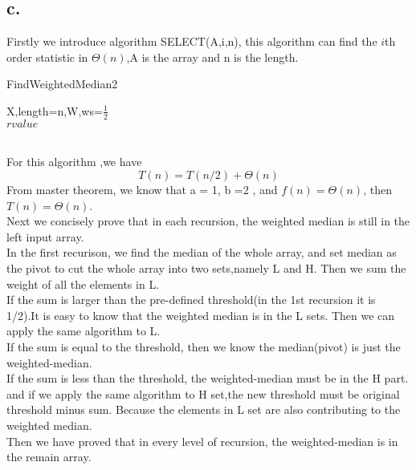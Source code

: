 \documentclass[oneside]{homework} %
\begin{document}
\subsection* {c.}
Firstly we introduce algorithm SELECT(A,i,n), this algorithm can find the $i$th order statistic in $\Theta(n)$,A is the array and n is the length.
  \begin{algorithm}[h]
  \caption{FindWeightedMedian2}
  \label{algo:weightmedian2}
  \begin{algorithmic}[1]
	\REQUIRE X,length=n,W,ws=$\frac{1}{2}$
	\ENSURE ~ ~\\ 
	\ENDIF
	\ELSE
	\ENDIF
	\LASTCON $rvalue$	
  \end{algorithmic}
  \end{algorithm}
\\ For this algorithm ,we have
\begin{equation}
  T(n) = T(n/2) + \Theta(n)
  \label{equ:weightedmedian2}
\end{equation}
From master theorem, we know that a = 1, b =2 , and $f(n) = \Theta(n)$, then $T(n) = \Theta(n)$.
\\ Next we concisely prove that in each recursion, the weighted median is still in the left input array. \\In the first recurison, we find the median of the whole array, and set median as the pivot to cut the whole array into two sets,namely L and H. Then we sum the weight of all the elements in L.\\ If the sum is larger than the pre-defined threshold(in the 1st recursion it is 1/2).It is easy to know that the weighted median is in the L sets.
Then we can apply the same algorithm to L. \\ 
If the sum is equal to the threshold, then we know the median(pivot) is just the weighted-median.\\
If the sum is less than the threshold, the weighted-median must be in the H part. and if we apply the same algorithm to H set,the new threshold must be original threshold minus sum. Because the elements in L set are also contributing to the weighted median. 
\\ Then we have proved that in every level of recursion, the weighted-median is in the remain array.
\end{document}
